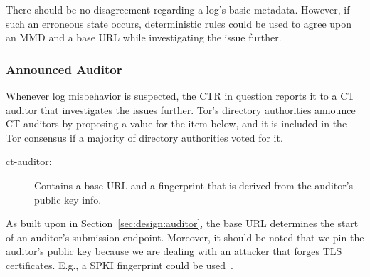 There should be no disagreement regarding a log's basic metadata.  However, if
such an erroneous state occurs, deterministic rules could be used to agree upon
an MMD and a base URL while investigating the issue further.

\subsubsection{Announced Auditor}
Whenever log misbehavior is suspected, the CTR in question reports it to a
CT auditor that investigates the issues further.  Tor's directory authorities
announce CT auditors by proposing a value for the item below, and it is included
in the Tor consensus if a majority of directory authorities voted for it.
\begin{description}
	\item[ct-auditor:] Contains a base URL and a fingerprint that is derived
		from the auditor's public key info.
\end{description}

As built upon in Section~\ref{sec:design:auditor}, the base URL determines the
start of an auditor's submission endpoint.  Moreover, it should be noted that
we pin the auditor's public key because we are dealing with an attacker that
forges TLS certificates.  E.g., a SPKI fingerprint could be used~\cite{hpkp}.

